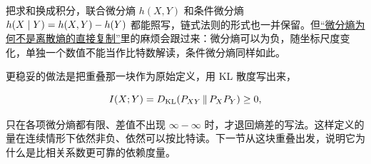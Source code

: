把求和换成积分，联合微分熵 \(h(X,Y)\) 和条件微分熵 \(h(X\mid Y)=h(X,Y)-h(Y)\) 都能照写，链式法则的形式也一并保留。但\hyperref[sec:07-Information-Theory/01-Information-and-Entropy/03]{``微分熵为何不是离散熵的直接复制''}里的麻烦会跟过来：微分熵可以为负，随坐标尺度变化，单独一个数值不能当作比特数解读，条件微分熵同样如此。

更稳妥的做法是把重叠那一块作为原始定义，用 KL 散度写出来，

\[
I(X;Y)=D_{\mathrm{KL}}(P_{XY}\,\|\,P_XP_Y)\ge 0,
\]

只在各项微分熵都有限、差值不出现 \(\infty-\infty\) 时，才退回熵差的写法。这样定义的量在连续情形下依然非负、依然可以按比特读。下一节从这块重叠出发，说明它为什么是比相关系数更可靠的依赖度量。
